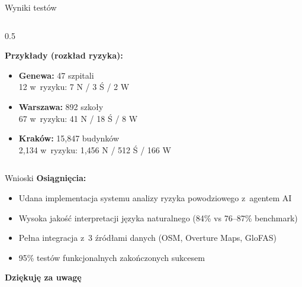 \documentclass[aspectratio=169]{beamer}
\begin{document}
\begin{frame}{Wyniki testów}
\begin{columns}[T]
\begin{column}{0.5\textwidth}
\vspace{0.2cm}

\textbf{Przykłady (rozkład ryzyka):}
\begin{itemize}
    \item \textbf{Genewa:} 47 szpitali\\12 w~ryzyku: 7 N / 3 Ś / 2 W
    \item \textbf{Warszawa:} 892 szkoły\\67 w~ryzyku: 41 N / 18 Ś / 8 W
    \item \textbf{Kraków:} 15,847 budynków\\2,134 w~ryzyku: 1,456 N / 512 Ś / 166 W
\end{itemize}
\end{column}
\end{columns}
\end{frame}

\begin{frame}{Wnioski}
\textbf{Osiągnięcia:}
\begin{itemize}
    \item Udana implementacja systemu analizy ryzyka powodziowego z~agentem AI
    \item Wysoka jakość interpretacji języka naturalnego (84\% vs 76--87\% benchmark)
    \item Pełna integracja z~3 źródłami danych (OSM, Overture Maps, GloFAS)
    \item 95\% testów funkcjonalnych zakończonych sukcesem
\end{itemize}

\vspace{1cm}

\begin{center}
\Large \textbf{Dziękuję za uwagę}
\end{center}
\end{frame}
\end{document}
